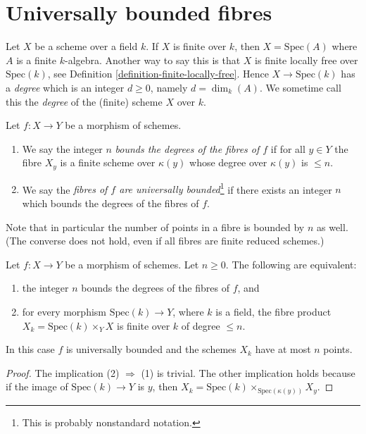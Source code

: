 \section{Universally bounded fibres}
\label{section-universally-bounded}

\noindent
Let $X$ be a scheme over a field $k$. If $X$ is finite over $k$,
then $X = \text{Spec}(A)$ where $A$ is a finite $k$-algebra. Another way
to say this is that $X$ is finite locally free over $\text{Spec}(k)$,
see Definition \ref{definition-finite-locally-free}. Hence
$X \to \text{Spec}(k)$ has a {\it degree} which is an integer $d \geq 0$,
namely $d = \dim_k(A)$. We sometime call this the {\it degree} of the (finite)
scheme $X$ over $k$.

\begin{definition}
\label{definition-universally-bounded}
Let $f : X \to Y$ be a morphism of schemes.
\begin{enumerate}
\item We say the integer $n$ {\it bounds the degrees of the fibres
of $f$} if for all $y \in Y$
the fibre $X_y$ is a finite scheme over $\kappa(y)$ whose
degree over $\kappa(y)$ is $\leq n$.
\item We say the {\it fibres of $f$ are universally bounded}\footnote{This is
probably nonstandard notation.}
if there exists an integer $n$ which bounds the degrees of the fibres
of $f$.
\end{enumerate}
\end{definition}

\noindent
Note that in particular the number of points in a fibre is bounded by $n$
as well. (The converse does not hold, even if all fibres are finite reduced
schemes.)

\begin{lemma}
\label{lemma-characterize-universally-bounded}
Let $f : X \to Y$ be a morphism of schemes. Let $n \geq 0$.
The following are equivalent:
\begin{enumerate}
\item the integer $n$ bounds the degrees of the fibres of $f$, and
\item for every morphism $\text{Spec}(k) \to Y$, where $k$ is a field,
the fibre product $X_k = \text{Spec}(k) \times_Y X$ is finite over $k$
of degree $\leq n$.
\end{enumerate}
In this case $f$ is universally bounded and the schemes $X_k$ have at most
$n$ points.
\end{lemma}

\begin{proof}
The implication (2) $\Rightarrow$ (1) is trivial. The other implication
holds because if the image of $\text{Spec}(k) \to Y$ is $y$, then
$X_k = \text{Spec}(k) \times_{\text{Spec}(\kappa(y))} X_y$.
\end{proof}

